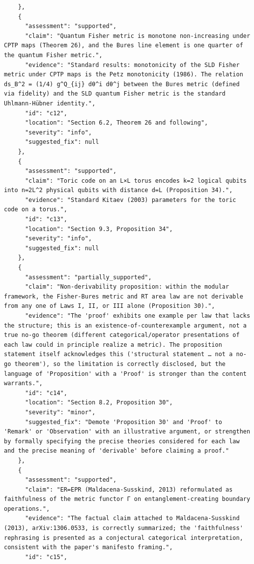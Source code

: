 \documentclass[11pt]{article}
\begin{document}
\begin{verbatim}
    },
    {
      "assessment": "supported",
      "claim": "Quantum Fisher metric is monotone non-increasing under CPTP maps (Theorem 26), and the Bures line element is one quarter of the quantum Fisher metric.",
      "evidence": "Standard results: monotonicity of the SLD Fisher metric under CPTP maps is the Petz monotonicity (1986). The relation ds_B^2 = (1/4) g^Q_{ij} dθ^i dθ^j between the Bures metric (defined via fidelity) and the SLD quantum Fisher metric is the standard Uhlmann-Hübner identity.",
      "id": "c12",
      "location": "Section 6.2, Theorem 26 and following",
      "severity": "info",
      "suggested_fix": null
    },
    {
      "assessment": "supported",
      "claim": "Toric code on an L×L torus encodes k=2 logical qubits into n=2L^2 physical qubits with distance d=L (Proposition 34).",
      "evidence": "Standard Kitaev (2003) parameters for the toric code on a torus.",
      "id": "c13",
      "location": "Section 9.3, Proposition 34",
      "severity": "info",
      "suggested_fix": null
    },
    {
      "assessment": "partially_supported",
      "claim": "Non-derivability proposition: within the modular framework, the Fisher-Bures metric and RT area law are not derivable from any one of Laws I, II, or III alone (Proposition 30).",
      "evidence": "The 'proof' exhibits one example per law that lacks the structure; this is an existence-of-counterexample argument, not a true no-go theorem (different categorical/operator presentations of each law could in principle realize a metric). The proposition statement itself acknowledges this ('structural statement … not a no-go theorem'), so the limitation is correctly disclosed, but the language of 'Proposition' with a 'Proof' is stronger than the content warrants.",
      "id": "c14",
      "location": "Section 8.2, Proposition 30",
      "severity": "minor",
      "suggested_fix": "Demote 'Proposition 30' and 'Proof' to 'Remark' or 'Observation' with an illustrative argument, or strengthen by formally specifying the precise theories considered for each law and the precise meaning of 'derivable' before claiming a proof."
    },
    {
      "assessment": "supported",
      "claim": "ER=EPR (Maldacena-Susskind, 2013) reformulated as faithfulness of the metric functor Γ on entanglement-creating boundary operations.",
      "evidence": "The factual claim attached to Maldacena-Susskind (2013), arXiv:1306.0533, is correctly summarized; the 'faithfulness' rephrasing is presented as a conjectural categorical interpretation, consistent with the paper's manifesto framing.",
      "id": "c15",

\end{verbatim}
\end{document}
